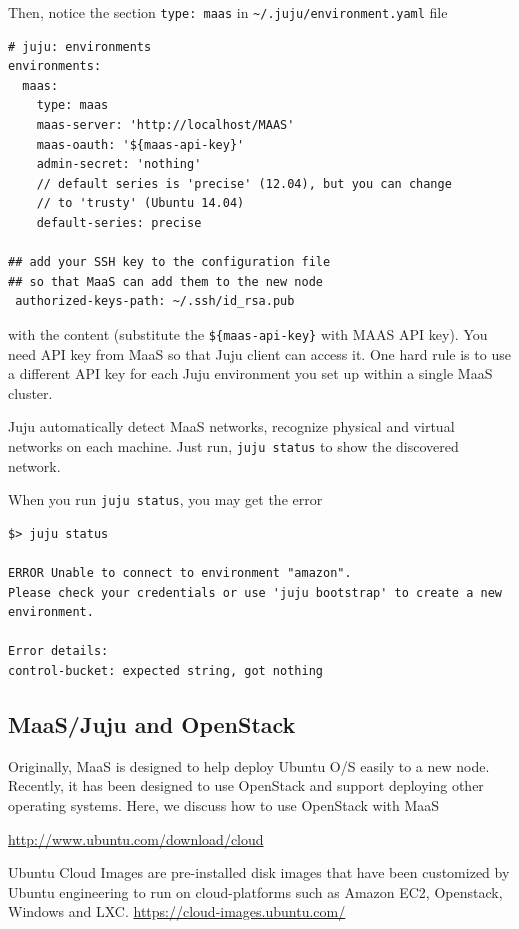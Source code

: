 Then, notice the section \verb!type: maas! in \verb!~/.juju/environment.yaml!
file
\begin{verbatim}
# juju: environments
environments:
  maas:
    type: maas
    maas-server: 'http://localhost/MAAS'
    maas-oauth: '${maas-api-key}'
    admin-secret: 'nothing'
    // default series is 'precise' (12.04), but you can change
    // to 'trusty' (Ubuntu 14.04)
    default-series: precise
    
## add your SSH key to the configuration file
## so that MaaS can add them to the new node    
 authorized-keys-path: ~/.ssh/id_rsa.pub     
\end{verbatim}
with the content (substitute the \verb!${maas-api-key}! with MAAS API key). 
You need API key from MaaS so that Juju client can access it. One hard rule is
to use a different API key for each Juju environment you set up within a single
MaaS cluster.
  
Juju automatically detect MaaS networks, recognize physical and virtual networks
on each machine. Just run, \verb!juju status! to show the discovered network.

 When you run \verb!juju status!, you may get the error
\begin{verbatim}
$> juju status

ERROR Unable to connect to environment "amazon".
Please check your credentials or use 'juju bootstrap' to create a new environment.

Error details:
control-bucket: expected string, got nothing

\end{verbatim}




\subsection{MaaS/Juju and OpenStack}
\label{sec:MaaS_OpenStack}

Originally, MaaS is designed to help deploy Ubuntu O/S easily to a new node.
Recently, it has been designed to use OpenStack and support deploying other
operating systems.
Here, we discuss how to use OpenStack with MaaS

\url{http://www.ubuntu.com/download/cloud}

Ubuntu Cloud Images are pre-installed disk images that have been customized by
Ubuntu engineering to run on cloud-platforms such as Amazon EC2, Openstack, Windows and LXC.
\url{https://cloud-images.ubuntu.com/}

